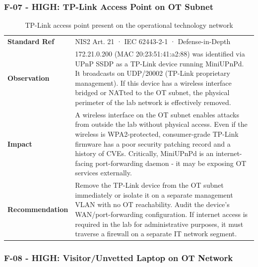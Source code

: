 \subsubsection{F-07 - HIGH: TP-Link Access Point on OT Subnet}

\begin{table}[H]
\centering
\begin{tabular}{@{}p{}p{}@{}}
\toprule
\textbf{Standard Ref} & NIS2 Art. 21 · IEC 62443-2-1 · Defense-in-Depth \\
\textbf{Observation} & 172.21.0.200 (MAC 20:23:51:41:a2:88) was identified via UPnP SSDP as a TP-Link device running MiniUPnPd. It broadcasts on UDP/20002 (TP-Link proprietary management). If this device has a wireless interface bridged or NATted to the OT subnet, the physical perimeter of the lab network is effectively removed. \\
\textbf{Impact} & A wireless interface on the OT subnet enables attacks from outside the lab without physical access. Even if the wireless is WPA2-protected, consumer-grade TP-Link firmware has a poor security patching record and a history of CVEs. Critically, MiniUPnPd is an internet-facing port-forwarding daemon - it may be exposing OT services externally. \\
\textbf{Recommendation} & Remove the TP-Link device from the OT subnet immediately or isolate it on a separate management VLAN with no OT reachability. Audit the device's WAN/port-forwarding configuration. If internet access is required in the lab for administrative purposes, it must traverse a firewall on a separate IT network segment. \\
\bottomrule
\end{tabular}
\caption{TP-Link access point present on the operational technology network}
\end{table}

\subsubsection{F-08 - HIGH: Visitor/Unvetted Laptop on OT Network}

